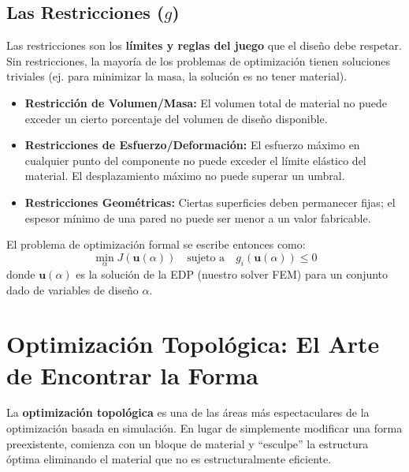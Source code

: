 \subsection{Las Restricciones (\(g\))}
Las restricciones son los \textbf{límites y reglas del juego} que el diseño debe respetar. Sin restricciones, la mayoría de los problemas de optimización tienen soluciones triviales (ej. para minimizar la masa, la solución es no tener material).
\begin{itemize}
    \item \textbf{Restricción de Volumen/Masa:} El volumen total de material no puede exceder un cierto porcentaje del volumen de diseño disponible.
    \item \textbf{Restricciones de Esfuerzo/Deformación:} El esfuerzo máximo en cualquier punto del componente no puede exceder el límite elástico del material. El desplazamiento máximo no puede superar un umbral.
    \item \textbf{Restricciones Geométricas:} Ciertas superficies deben permanecer fijas; el espesor mínimo de una pared no puede ser menor a un valor fabricable.
\end{itemize}

El problema de optimización formal se escribe entonces como:
\begin{equation}
    \min_{\alpha} J(\bm{u}(\alpha)) \quad \text{sujeto a} \quad g_i(\bm{u}(\alpha)) \le 0
\end{equation}
donde \(\bm{u}(\alpha)\) es la solución de la EDP (nuestro solver FEM) para un conjunto dado de variables de diseño \(\alpha\).

\section{Optimización Topológica: El Arte de Encontrar la Forma}
\label{sec:topo-opt}
La \textbf{optimización topológica} es una de las áreas más espectaculares de la optimización basada en simulación. En lugar de simplemente modificar una forma preexistente, comienza con un bloque de material y ``esculpe'' la estructura óptima eliminando el material que no es estructuralmente eficiente.


